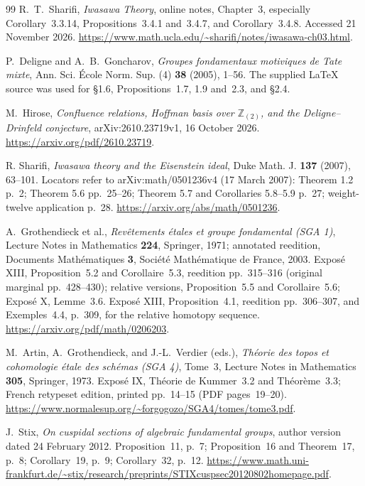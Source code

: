 \documentclass[11pt,a4paper]{article}
\theoremstyle{definition}
\begin{document}
\begin{thebibliography}{99}
R.~T.~Sharifi, \emph{Iwasawa Theory}, online notes, Chapter~3,
especially Corollary~3.3.14, Propositions~3.4.1 and~3.4.7,
and Corollary~3.4.8. Accessed 21 November 2026.
\url{https://www.math.ucla.edu/~sharifi/notes/iwasawa-ch03.html}.


P.~Deligne and A.~B.~Goncharov,
\emph{Groupes fondamentaux motiviques de Tate mixte},
Ann. Sci. \'Ecole Norm. Sup. (4) \textbf{38} (2005), 1--56.
The supplied LaTeX source was used for \S1.6,
Propositions~1.7, 1.9 and~2.3, and \S2.4.


M.~Hirose, \emph{Confluence relations, Hoffman basis over $\mathbb Z_{(2)}$,
and the Deligne--Drinfeld conjecture},
arXiv:2610.23719v1, 16 October 2026.
\url{https://arxiv.org/pdf/2610.23719}.


 R. Sharifi, \emph{Iwasawa theory and the Eisenstein ideal}, Duke Math. J. \textbf{137} (2007), 63--101. Locators refer to arXiv:math/0501236v4 (17 March 2007): Theorem 1.2 p.~2; Theorem 5.6 pp.~25--26; Theorem 5.7 and Corollaries 5.8--5.9 p.~27; weight-twelve application p.~28. \url{https://arxiv.org/abs/math/0501236}.

A.~Grothendieck et al., \emph{Rev\^etements \'etales et groupe fondamental
(SGA 1)}, Lecture Notes in Mathematics \textbf{224}, Springer, 1971;
annotated reedition, Documents Math\'ematiques \textbf{3},
Soci\'et\'e Math\'ematique de France, 2003.
Expos\'e XIII, Proposition~5.2 and Corollaire~5.3,
reedition pp.~315--316 (original marginal pp.~428--430);
relative versions, Proposition~5.5 and Corollaire~5.6;
Expos\'e X, Lemme~3.6.
Expos\'e XIII, Proposition~4.1, reedition pp.~306--307,
and Exemples~4.4, p.~309, for the relative homotopy sequence.
\url{https://arxiv.org/pdf/math/0206203}.


M.~Artin, A.~Grothendieck, and J.-L.~Verdier (eds.),
\emph{Th\'eorie des topos et cohomologie \'etale des sch\'emas
(SGA 4)}, Tome~3, Lecture Notes in Mathematics \textbf{305},
Springer, 1973. Expos\'e IX, Th\'eorie de Kummer~3.2 and
Th\'eor\`eme~3.3; French retypeset edition, printed pp.~14--15
(PDF pages~19--20).
\url{https://www.normalesup.org/~forgogozo/SGA4/tomes/tome3.pdf}.


J.~Stix, \emph{On cuspidal sections of algebraic fundamental groups},
author version dated 24 February 2012.
Proposition~11, p.~7; Proposition~16 and Theorem~17, p.~8;
Corollary~19, p.~9; Corollary~32, p.~12.
\url{https://www.math.uni-frankfurt.de/~stix/research/preprints/STIXcuspsec20120802homepage.pdf}.



\end{thebibliography}
\end{document}
